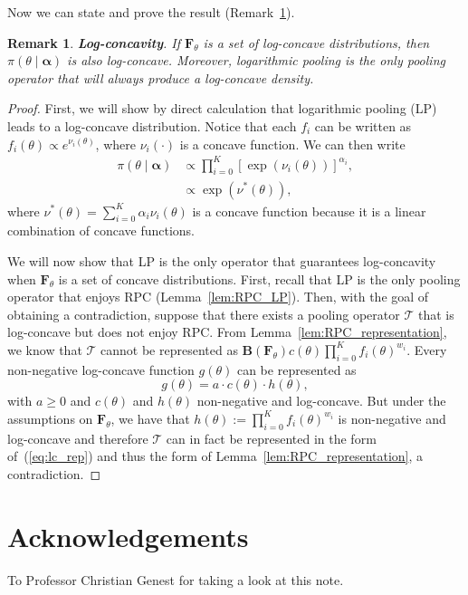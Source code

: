 \documentclass[a4paper, notitlepage, 10pt]{article}
\newtheorem{remark}{Remark}[]
\begin{document}
Now we can state and prove the result (Remark~\ref{rmk:concavity}).
\begin{remark}
\label{rmk:concavity}
\textbf{Log-concavity}. 
If $\mathbf{F}_{\theta}$ is a set of log-concave distributions, then $\pi(\theta\mid \boldsymbol \alpha)$ is also log-concave.
Moreover, logarithmic pooling is the only pooling operator that will always produce a log-concave density.
\end{remark}
\begin{proof}
First, we will show by direct calculation that logarithmic pooling (LP) leads to a log-concave distribution.
Notice that each $f_i$ can be written as $ f_i(\theta) \propto e^{\nu_i(\theta)}$, where $\nu_i(\cdot)$ is a concave function.
We can then write
\begin{align*}
 \pi(\theta \mid \boldsymbol \alpha) &\propto \prod_{i=0}^{K} [\exp(\nu_i(\theta))]^{\alpha_i},\\
             &\propto \exp(\nu^{\ast}(\theta)),
\end{align*}
 where $\nu^{\ast}(\theta) = \sum_{i=0}^{K}\alpha_i\nu_i(\theta)$ is a concave function because it is a linear combination of concave functions.
 
 We will now show that LP is the only operator that guarantees log-concavity when $\boldsymbol F_\theta$ is a set of concave distributions.
 First, recall that LP is the only pooling operator that enjoys RPC (Lemma~\ref{lem:RPC_LP}).
 Then, with the goal of obtaining a contradiction, suppose that there exists a pooling operator $\mathcal{T}$ that is log-concave but does not enjoy RPC.
 From Lemma~\ref{lem:RPC_representation}, we know that $\mathcal{T}$ cannot be represented as $\boldsymbol B(\boldsymbol F_\theta) c(\theta) \prod_{i=0}^K f_i(\theta)^{w_i} $.
Every non-negative log-concave function $g(\theta)$ can be represented as
 \begin{equation}
 \label{eq:lc_rep}
  g(\theta) = a \cdot c(\theta) \cdot h(\theta),
 \end{equation}
with $a \geq 0$ and $c(\theta)$ and $h(\theta)$ non-negative and log-concave.
But under the assumptions on $\boldsymbol F_\theta$, we have that $h(\theta) := \prod_{i=0}^K f_i(\theta)^{w_i}$ is non-negative and log-concave and therefore $\mathcal{T}$ can in fact be represented in the form of~(\ref{eq:lc_rep}) and thus the form of Lemma~\ref{lem:RPC_representation}, a contradiction. 
\end{proof}

\section*{Acknowledgements}
To Professor Christian Genest for taking a look at this note.

\end{document}

